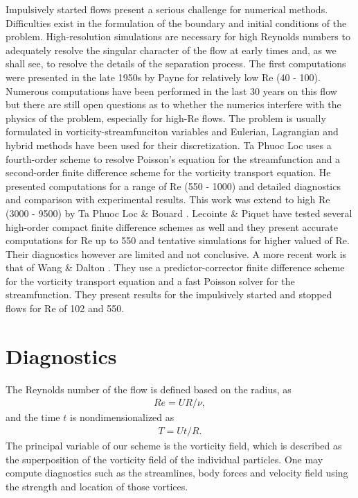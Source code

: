 Impulsively started flows present a serious challenge for numerical methods.
Difficulties exist in the formulation of the boundary and initial conditions of the problem.
High-resolution simulations are necessary for high Reynolds numbers to adequately resolve the singular character of the flow at early times and, as we shall see, to resolve the details of the separation process.
The first computations were presented in the late 1950s by Payne \cite{payne1958calculations} for relatively low Re (40 - 100).
Numerous computations have been performed in the last 30 years on this flow but there are still open questions as to whether the numerics interfere with the physics of the problem, especially for high-Re flows.
The problem is usually formulated in vorticity-streamfunciton variables and Eulerian, Lagrangian and hybrid methods have been used for their discretization.
Ta Phuoc Loc \cite{loc1980numerical} uses a fourth-order scheme to resolve Poisson's equation for the streamfunction and a second-order finite difference scheme for the vorticity transport equation.
He presented computations for a range of Re (550 - 1000) and detailed diagnostics and comparison with experimental results.
This work was extend to high Re (3000 - 9500) by Ta Phuoc Loc \& Bouard \cite{loc1985numerical}.
Lecointe \& Piquet \cite{lecointe1984use}  have tested several high-order compact finite difference schemes as well and they present accurate computations for Re up to 550 and  tentative simulations for higher valued of Re.
Their diagnostics however are limited and not conclusive.
A more recent work is that of Wang \& Dalton \cite{wang1991numerical}.
They use a predictor-corrector finite difference scheme for the vorticity transport equation and a fast Poisson solver for the streamfunction.
They present results for the impulsively started and stopped flows for Re of 102 and 550.

\section{Diagnostics}

The Reynolds number of the flow is defined based on the radius, as
\begin{align}
Re = UR/\nu,
\end{align}
and the time $t$ is nondimensionalized as
\begin{align}
T = Ut/R.
\end{align}
The principal variable of our scheme is the vorticity field, which is described as the superposition of the vorticity field of the individual particles.
One may compute diagnostics such as the streamlines, body forces and velocity field using the strength and location of those vortices.


